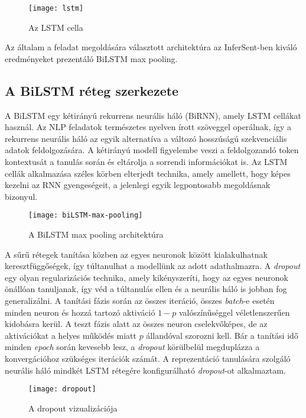 \begin{figure}[H]
	\centering
	\texttt{[image: lstm]}
	\caption{Az LSTM cella \cite{rnn}}
\end{figure}

Az általam a feladat megoldására választott architektúra az InferSent-ben kiváló eredményeket prezentáló BiLSTM max pooling.

\subsection{A BiLSTM réteg szerkezete}
A BiLSTM egy kétirányú rekurrens neurális háló (BiRNN), amely LSTM cellákat használ. Az NLP feladatok természetes nyelven írott szöveggel operálnak, így a rekurrens neurális háló az egyik alternatíva a változó hosszúságú szekvenciális adatok feldolgozására. A kétirányú modell figyelembe veszi a feldolgozandó token kontextusát a tanulás során és eltárolja a sorrendi információkat is. Az LSTM cellák alkalmazása széles körben elterjedt technika, amely amellett, hogy képes kezelni az RNN gyengeségeit, a jelenlegi egyik legpontosabb megoldásnak bizonyul.

\begin{figure}[H]
	\centering
	\texttt{[image: biLSTM-max-pooling]}
	\caption{A BiLSTM max pooling architektúra}
\end{figure}

A sűrű rétegek tanítása közben az egyes neuronok között kialakulhatnak keresztfüggőségek, így túltanulhat a modellünk az adott adathalmazra. A \textit{dropout} egy olyan regularizációs technika, amely kikényszeríti, hogy az egyes neuronok önállóan tanuljanak, így véd a túltanulás ellen és a neurális háló is jobban fog generalizálni. A tanítási fázis során az összes iteráció, összes \textit{batch}-e esetén minden neuron és hozzá tartozó aktiváció $1-p$ valószínűséggel véletlenszerűen kidobásra kerül. A teszt fázis alatt az összes neuron cselekvőképes, de az aktivációkat a helyes működés miatt $p$ állandóval szorozni kell. Bár a tanítási idő minden \textit{epoch} során kevesebb lesz, a \textit{dropout} körülbelül megduplázza a konvergációhoz szükséges iterációk számát. A reprezentáció tanulására szolgáló neurális háló mindkét LSTM rétegére konfigurálható \textit{dropout}-ot alkalmaztam.

\begin{figure}[H]
	\centering
	\texttt{[image: dropout]}
	\caption{A dropout vizualizációja \cite{dropout}}
\end{figure}

